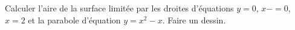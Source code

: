 
\begin{exercice}\label{exoTD5-0002}

	Calculer l'aire de la surface limitée par les droites d'équations $y=0$, $x-=0$, $x=2$ et la parabole d'équation $y=x^2-x$. Faire un dessin.

\end{exercice}
